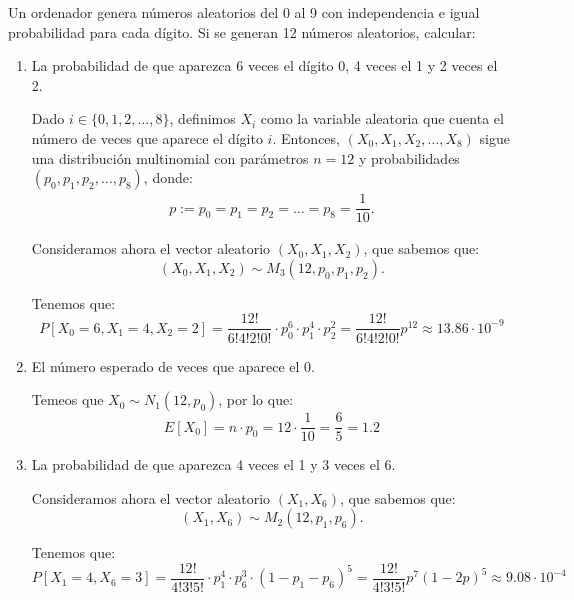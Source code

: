 \begin{ejercicio}
    Un ordenador genera números aleatorios del 0 al 9 con independencia e igual probabilidad para cada dígito. Si se generan 12 números aleatorios, calcular:
    \begin{enumerate}
        \item La probabilidad de que aparezca 6 veces el dígito 0, 4 veces el 1 y 2 veces el 2.
        
        Dado $i\in \{0,1,2,\ldots,8\}$, definimos $X_i$ como la variable aleatoria que cuenta el número de veces que aparece el dígito $i$. Entonces, $(X_0,X_1,X_2,\ldots,X_8)$ sigue una distribución multinomial con parámetros $n = 12$ y probabilidades $(p_0,p_1,p_2,\ldots,p_8)$, donde:
        \begin{gather*}
            p := p_0 = p_1 = p_2 = \ldots = p_8 = \dfrac{1}{10}.
        \end{gather*}

        Consideramos ahora el vector aleatorio $(X_0,X_1,X_2)$, que sabemos que:
        \begin{equation*}
            (X_0,X_1,X_2) \sim M_3\left(12,p_0,p_1,p_2\right).
        \end{equation*}

        Tenemos que:
        \begin{equation*}
            P[X_0 = 6,X_1 = 4,X_2 = 2] = \dfrac{12!}{6!4!2!0!}\cdot p_0^6 \cdot p_1^4 \cdot p_2^2
            = \dfrac{12!}{6!4!2!0!} p^{12}
            \approx 13.86\cdot 10^{-9}
        \end{equation*}
        \item El número esperado de veces que aparece el 0.
        
        Temeos que $X_0 \sim N_1\left(12,p_0\right)$, por lo que:
        \begin{equation*}
            E[X_0] = n\cdot p_0 = 12\cdot \dfrac{1}{10} = \frac{6}{5} = 1.2
        \end{equation*}
        \item La probabilidad de que aparezca 4 veces el 1 y 3 veces el 6.
        
        Consideramos ahora el vector aleatorio $(X_1,X_6)$, que sabemos que:
        \begin{equation*}
            (X_1,X_6) \sim M_2\left(12,p_1,p_6\right).
        \end{equation*}

        Tenemos que:
        \begin{equation*}
            P[X_1 = 4,X_6 = 3] = \dfrac{12!}{4!3!5!}\cdot p_1^4 \cdot p_6^3 \cdot (1-p_1-p_6)^5
            = \dfrac{12!}{4!3!5!} p^7 (1-2p)^5
            \approx 9.08\cdot 10^{-4}
        \end{equation*}
    \end{enumerate}
\end{ejercicio}

